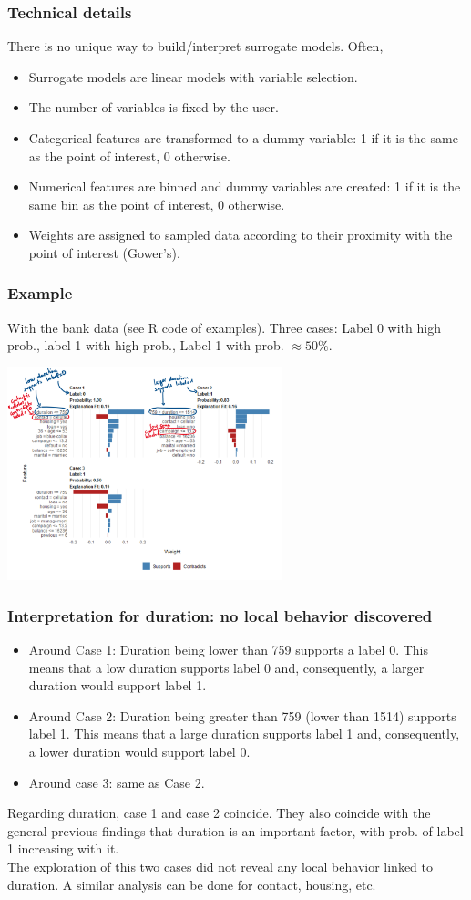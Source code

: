 \begin{frame}
\frametitle{Technical details}
There is no unique way to build/interpret surrogate models. Often,
\begin{itemize}
\item Surrogate models are linear models with variable selection.
\item The number of variables is fixed by the user.
\item Categorical features are transformed to a dummy variable: 1 if it is the same as the point of interest, 0 otherwise.
\item Numerical features are binned and dummy variables are created: 1 if it is the same bin as the point of interest, 0 otherwise.
\item Weights are assigned to sampled data according to their proximity with the point of interest (Gower's).
\end{itemize}
\end{frame}
\begin{frame}
\frametitle{Example}
With the bank data (see R code of examples). Three cases: Label 0 with high prob., label 1 with high prob., Label 1 with prob. $\approx 50\%$.
\begin{center}
\includegraphics[width=8cm]{../Graphs/LIME_interpret.png}
\end{center}
\end{frame}
\begin{frame}
\frametitle{Interpretation for duration: no local behavior discovered}
\begin{itemize}
\item Around Case 1: Duration being lower than 759 supports a label 0. This means that a low duration supports label 0 and, consequently, a larger duration would support label 1. 
\item Around Case 2: Duration being greater than 759 (lower than 1514) supports label 1. This means that a large duration supports label 1 and, consequently, a lower duration would support label 0.
\item Around case 3: same as Case 2.
\end{itemize}
Regarding duration, case 1 and case 2 coincide. They also coincide with the general previous findings that duration is an important factor, with prob. of label 1 increasing with it.\\
\vspace{0.2cm}
The exploration of this two cases did not reveal any local behavior linked to duration. A similar analysis can be done for contact, housing, etc. 
\end{frame}
